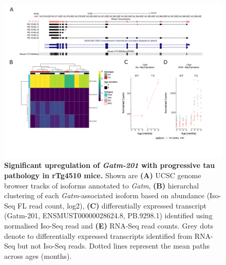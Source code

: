 \begin{landscape}
	\begin{figure}[!htp]
		\centering
		\includegraphics[page=3,trim={1.5cm 3.5cm 2cm 1cm}, scale = 0.85]{Figures/Ch5_DiffPlots_Landscape.pdf}
		\captionsetup{width=1.5\textwidth}
		\caption[Differential \textit{Gatm} transcript expression]%
		{\textbf{Significant upregulation of \textit{Gatm-201} with progressive tau pathology in rTg4510 mice.} Shown are \textbf{(A)} UCSC genome browser tracks of isoforms annotated to \textit{Gatm}, \textbf{(B)} hierarchal clustering of each \textit{Gatm}-associated isoform based on abundance (Iso-Seq FL read count, log2), \textbf{(C)} differentially expressed transcript (Gatm-201, ENSMUST00000028624.8, PB.9298.1) identified using normalised Iso-Seq read and \textbf{(E)} RNA-Seq read counts. Grey dots denote to differentially expressed transcripts identified from RNA-Seq but not Iso-Seq reads. Dotted lines represent the mean paths across ages (months).}   
		\label{fig:Gatm}
	\end{figure}	
\end{landscape}


